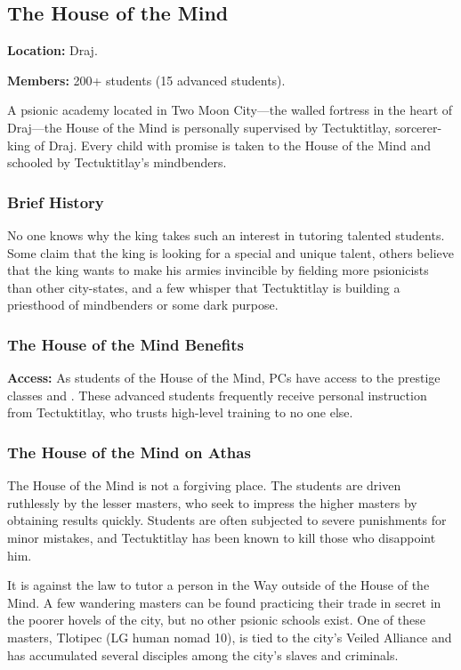 \subsection{The House of the Mind}
\textbf{Location:} Draj.

\textbf{Members:} 200+ students (15 advanced students).

A psionic academy located in Two Moon City---the walled fortress in the heart of Draj---the House of the Mind is personally supervised by Tectuktitlay, sorcerer-king of Draj. Every child with promise is taken to the House of the Mind and schooled by Tectuktitlay's mindbenders.

\subsubsection{Brief History}
No one knows why the king takes such an interest in tutoring talented students. Some claim that the king is looking for a special and unique talent, others believe that the king wants to make his armies invincible by fielding more psionicists than other city-states, and a few whisper that Tectuktitlay is building a priesthood of mindbenders or some dark purpose.

\subsubsection{The House of the Mind Benefits}
\textbf{Access:} As students of the House of the Mind, PCs have access to the prestige classes  and . These advanced students frequently receive personal instruction from Tectuktitlay, who trusts high-level training to no one else.

\subsubsection{The House of the Mind on Athas}
The House of the Mind is not a forgiving place. The students are driven ruthlessly by the lesser masters, who seek to impress the higher masters by obtaining results quickly. Students are often subjected to severe punishments for minor mistakes, and Tectuktitlay has been known to kill those who disappoint him.

It is against the law to tutor a person in the Way outside of the House of the Mind. A few wandering masters can be found practicing their trade in secret in the poorer hovels of the city, but no other psionic schools exist. One of these masters, Tlotipec (LG human nomad 10), is tied to the city's Veiled Alliance and has accumulated several disciples among the city's slaves and criminals.


